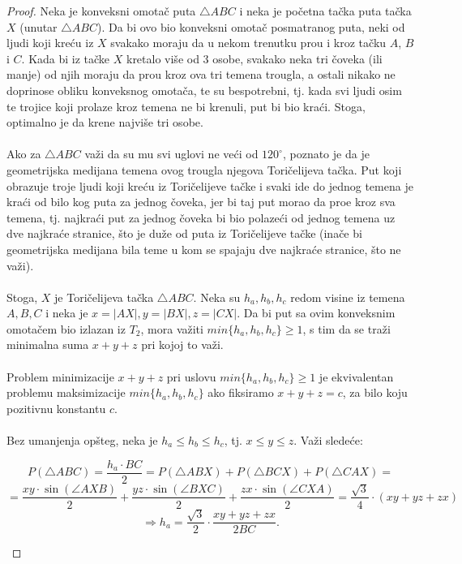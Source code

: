 \documentclass[11pt,letter]{article}
\begin{document}
\begin{proof}
Neka je konveksni omota\v c puta $\bigtriangleup ABC$ i neka je po\v cetna ta\v cka puta ta\v cka $X$ (unutar $\bigtriangleup ABC$). Da bi ovo bio konveksni omota\v c posmatranog puta, neki od ljudi koji kre\' cu iz $X$ svakako moraju da u nekom trenutku pro\dj u i kroz ta\v cku $A$, $B$ i $C$. Kada bi iz ta\v cke $X$ kretalo vi\v se od 3 osobe, svakako neka tri \v coveka (ili manje) od njih moraju da pro\dj u kroz ova tri temena trougla, a ostali nikako ne doprinose obliku konveksnog omota\v ca, te su bespotrebni, tj. kada svi ljudi osim te trojice koji prolaze kroz temena ne bi krenuli, put bi bio kra\' ci. Stoga, optimalno je da krene najvi\v se tri osobe. 
\\
\\
\indent Ako za $\bigtriangleup ABC$ va\v zi da su mu svi uglovi ne ve\' ci od $120^\circ$, poznato je da je geometrijska medijana temena ovog trougla njegova Tori\v celijeva ta\v cka. Put koji obrazuje troje ljudi koji kre\' cu iz Tori\v celijeve ta\v cke i svaki ide do jednog temena je kra\' ci od bilo kog puta za jednog \v coveka, jer bi taj put morao da pro\dj e kroz sva temena, tj. najkra\' ci put za jednog \v coveka bi bio polaze\' ci od jednog temena uz dve najkra\' ce stranice, \v sto je du\v ze od puta iz Tori\v celijeve ta\v cke (ina\v ce bi geometrijska medijana bila teme u kom se spajaju dve najkra\' ce stranice, \v sto ne va\v zi).
\\
\\
\indent Stoga, $X$ je Tori\v celijeva ta\v cka $\bigtriangleup ABC$. Neka su $h_a, h_b, h_c$ redom visine iz temena $A, B, C$ i neka je $x=|AX|, y=|BX|, z=|CX|$. Da bi put sa ovim konveksnim omota\v cem bio izlazan iz $T_2$, mora va\v ziti $min\{h_a,h_b,h_c\}\geqslant 1$, s tim da se tra\v zi minimalna suma $x+y+z$ pri kojoj to va\v zi.
\\
\\
\indent Problem minimizacije $x+y+z$ pri uslovu $min\{h_a,h_b,h_c\}\geqslant 1$ je ekvivalentan problemu maksimizacije $min\{h_a,h_b,h_c\}$ ako fiksiramo $x+y+z=c$, za bilo koju pozitivnu konstantu $c$.
\\
\\
\indent Bez umanjenja op\v steg, neka je $h_a\leqslant h_b\leqslant h_c$, tj. $x\leqslant y\leqslant z$. Va\v zi slede\' ce:
\begin{center}
$$P(\bigtriangleup ABC)=\frac{h_a\cdot BC}{2}=P(\bigtriangleup ABX)+P(\bigtriangleup BCX)+P(\bigtriangleup CAX)=$$
$$=\frac{xy\cdot \sin{(\angle AXB)}}{2}+\frac{yz\cdot \sin{(\angle BXC)}}{2}+\frac{zx\cdot \sin(\angle CXA)}{2}=\frac{\sqrt3}{4}\cdot(xy+yz+zx)$$
$$\Longrightarrow h_a=\frac{\sqrt3}{2}\cdot \frac{xy+yz+zx}{2BC}.$$
\end{center}
\end{proof} 
\smallskip
\end{document}
